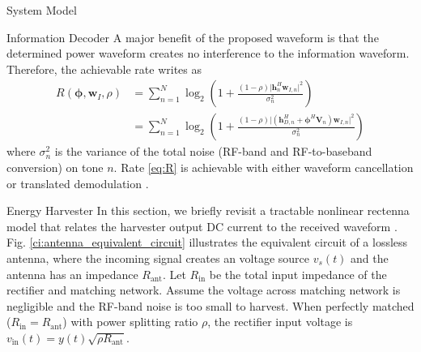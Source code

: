 \documentclass[journal]{IEEEtran}
\begin{document}
\begin{section}{System Model}
	\begin{subsection}{Information Decoder}
		A major benefit of the proposed waveform is that the determined power waveform creates no interference to the information waveform. Therefore, the achievable rate writes as
		\begin{equation}\label{eq:R}
			\begin{split}
				R(\boldsymbol{\phi},\boldsymbol{w}_I,\rho)
				& = \sum_{n=1}^N{\log_2\left(1+\frac{(1-\rho)\lvert \boldsymbol{h}_{n}^H\boldsymbol{w}_{I,n} \rvert^2}{\sigma_n^2}\right)}\\
				& = \sum_{n=1}^N{\log_2\left(1+\frac{(1-\rho)\lvert(\boldsymbol{h}_{D,n}^H+\boldsymbol{\phi}^H\boldsymbol{V}_n)\boldsymbol{w}_{I,n}\rvert^2}{\sigma_n^2}\right)}
			\end{split}
		\end{equation}
		where $\sigma_n^2$ is the variance of the total noise (RF-band and RF-to-baseband conversion) on tone $n$. Rate \ref{eq:R} is achievable with either waveform cancellation or translated demodulation \cite{Clerckx2018b}.
	\end{subsection}

	\begin{subsection}{Energy Harvester}
		In this section, we briefly revisit a tractable nonlinear rectenna model that relates the harvester output DC current to the received waveform \cite{Clerckx2016a,Clerckx2018b}. Fig. \ref{ci:antenna_equivalent_circuit} illustrates the equivalent circuit of a lossless antenna, where the incoming signal creates an voltage source $v_s(t)$ and the antenna has an impedance $R_{\text{ant}}$. Let $R_{\text{in}}$ be the total input impedance of the rectifier and matching network. Assume the voltage across matching network is negligible and the RF-band noise is too small to harvest. When perfectly matched ($R_{\text{in}}=R_{\text{ant}}$) with power splitting ratio $\rho$, the rectifier input voltage is $v_{\text{in}}(t)=y(t)\sqrt{\rho R_{\text{ant}}}$.


\end{subsection}
\end{section}
\end{document}
